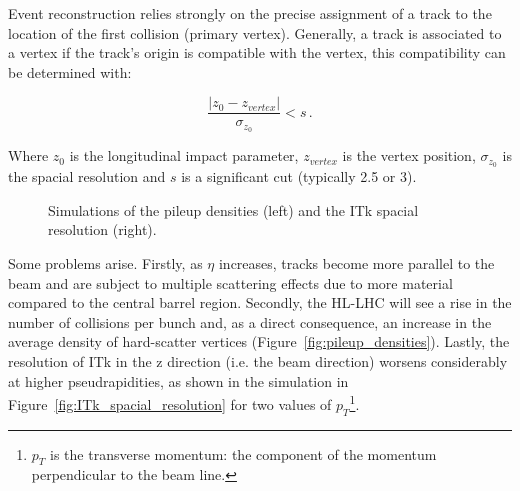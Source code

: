 Event reconstruction relies strongly on the precise assignment of a track to the location of the first collision (primary vertex). %
Generally, a track is associated to a vertex if the track's origin is compatible with the vertex, this compatibility can be determined with:

\begin{equation}\label{eq:compatibility_vertex}
    \frac{\left|z_0 - z_{vertex}\right|}{\sigma_{z_0}} < s \,.
\end{equation}
 
Where \(z_0\) is the longitudinal impact parameter, \(z_{vertex}\) is the vertex position, \(\sigma_{z_0}\) is the spacial resolution and \(s\) is a significant cut (typically 2.5 or 3)\cite{cernTechnicalDesign}. 

\begin{figure}[h!tbpt]
    \centering
    \hfill
    \centering
    \caption{Simulations of the pileup densities (left) and the ITk spacial resolution (right).}
\end{figure}

Some problems arise. 
Firstly, as \(\eta\) increases, tracks become more parallel to the beam and are subject to multiple scattering effects due to more material compared to the central barrel region. Secondly, the HL-LHC will see a rise in the number of collisions per bunch %
 and, as a direct consequence, an increase in the average density of hard-scatter vertices (Figure~\ref{fig:pileup_densities}). Lastly, the resolution of ITk in the z direction (i.e. the beam direction) worsens considerably at higher pseudrapidities, as shown in the simulation in Figure~\ref{fig:ITk_spacial_resolution} for two values of \(p_T\)\footnote{\(p_T\) is the transverse momentum: the component of the momentum perpendicular to the beam line.}.

